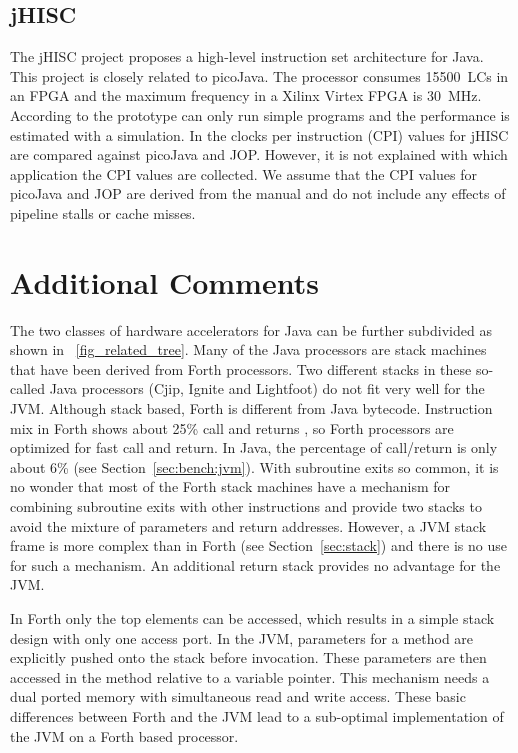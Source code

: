 \subsection{jHISC}

The jHISC project \cite{jHISC:jnl2006} proposes a high-level
instruction set architecture for Java. This project is closely
related to picoJava. The processor consumes 15500~LCs in an FPGA and
the maximum frequency in a Xilinx Virtex FPGA is 30~MHz.
%
%
According to \cite{jHISC:jnl2006} the prototype can only run simple
programs and the performance is estimated with a simulation. In
\cite{jHISC2006} the clocks per instruction (CPI) values for jHISC
are compared against picoJava and JOP. However, it is not explained
with which application the CPI values are collected. We assume that
the CPI values for picoJava and JOP are derived from the manual and
do not include any effects of pipeline stalls or cache misses.

\section{Additional Comments}

The two classes of hardware accelerators for Java can be further
subdivided as shown in \figurename~\ref{fig_related_tree}. Many of
the Java processors are stack machines that have been derived from
Forth processors. Two different stacks in these so-called Java
processors (Cjip, Ignite and Lightfoot) do not fit very well for the
JVM. Although stack based, Forth is different from Java bytecode.
Instruction mix in Forth shows about 25\% call and returns
\cite{Koopman89}, so Forth processors are optimized for fast call
and return. In Java, the percentage of call/return is only about 6\%
(see Section~\ref{sec:bench:jvm}). With subroutine exits so common,
it is no wonder that most of the Forth stack machines have a
mechanism for combining subroutine exits with other instructions and
provide two stacks to avoid the mixture of parameters and return
addresses. However, a JVM stack frame is more complex than in Forth
(see Section~\ref{sec:stack}) and there is no use for such a
mechanism. An additional return stack provides no advantage for the
JVM.

In Forth only the top elements can be accessed, which results in a
simple stack design with only one access port. In the JVM, parameters
for a method are explicitly pushed onto the stack before invocation.
These parameters are then accessed in the method relative to a
variable pointer. This mechanism needs a dual ported memory with
simultaneous read and write access. These basic differences between
Forth and the JVM lead to a sub-optimal implementation of the JVM on
a Forth based processor.

